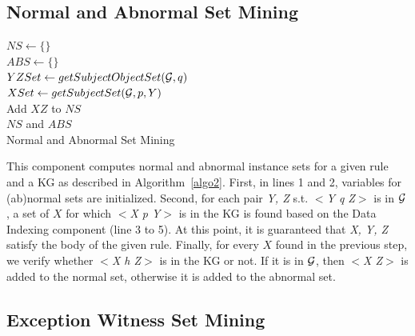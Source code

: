 \subsection{Normal and Abnormal Set Mining}

\IncMargin{1.5em}
\begin{algorithm}[h]
\DontPrintSemicolon
\SetAlgoLined
{}
\BlankLine
$NS \leftarrow \{\}$\\
$ABS \leftarrow \{\}$\\
$YZSet \leftarrow getSubjectObjectSet(\mathcal{G}, q)$\\
\BlankLine
{} {
    \BlankLine
	$XSet \leftarrow getSubjectSet(\mathcal{G}, p, Y)$\\
	 {
	 {
		Add $XZ$ to $NS$\\
	}
	}
}
\BlankLine
\Return $NS$ and $ABS$\\
\caption{Normal and Abnormal Set Mining}
\label{algo2}
\end{algorithm}
\DecMargin{1.5em}

This component computes normal and abnormal instance sets for a given rule and a KG as described in Algorithm~\ref{algo2}. First, in lines 1 and 2, variables for (ab)normal sets are initialized. Second, for each pair \textit{Y, Z} s.t. \textit{$<$Y q Z$>$} is in $\mathcal{G}$, a set of $X$ for which \textit{$<$X p Y$>$} is in the KG is found based on the Data Indexing component (line 3 to 5). At this point, it is guaranteed that \textit{X, Y, Z} satisfy the body of the given rule. Finally, for every $X$ found in the previous step, we verify whether \textit{$<$X h Z$>$} is in the KG or not. If it is in $\mathcal{G}$, then \textit{$<$X Z$>$} is added to the normal set, otherwise it is added to the abnormal set.

\subsection{Exception Witness Set Mining}

